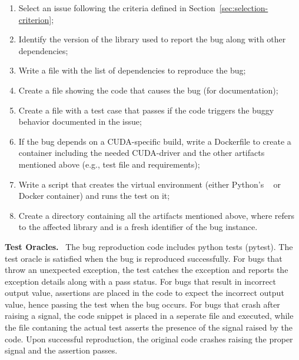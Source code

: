 \documentclass[sigconf,screen]{acmart}
\begin{document}
\begin{enumerate}[leftmargin=0.5cm]
  \item Select an issue following the criteria defined in Section~\ref{sec:selection-criterion};
  \item Identify the version of the library used to report the bug along with other dependencies;
  \item Write a  file with the list of dependencies to reproduce the bug;
  \item Create a file showing the code that causes the bug (for documentation);
  \item Create a file with a  test case that passes if
    the code triggers the buggy behavior documented in the issue;
  \item If the bug depends on a CUDA-specific build, write a
    Dockerfile to create a container including the needed CUDA-driver
    and the other artifacts mentioned above (e.g., test file and
    requirements);
  \item Write a script that creates the virtual environment (either
    Python's ~\cite{venv} or Docker container) and runs
    the test on it;
  \item Create a directory  containing all the
    artifacts mentioned above, where  refers to the
    affected library and  is a fresh identifier of the
    bug instance.
\end{enumerate}

\textbf{Test Oracles.}~
The bug reproduction code includes python tests (pytest). The test
oracle is satisfied when the bug is reproduced successfully. For bugs
that throw an unexpected exception, the test catches the exception and
reports the exception details along with a pass status. For bugs that
result in incorrect output value, assertions are placed in the code to
expect the incorrect output value, hence passing the test when the bug
occurs. For bugs that crash after raising a signal, the code snippet
is placed in a seperate file and executed, while the file contaning
the actual test asserts the presence of the signal raised by the
code. Upon successful reproduction, the original code crashes raising
the proper signal and the assertion passes.
\end{document}
